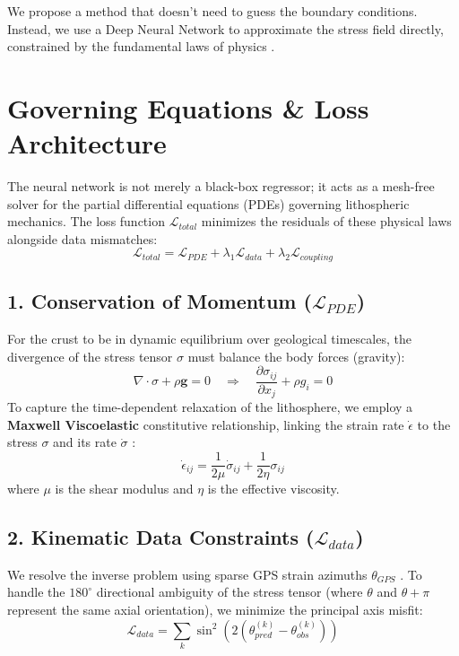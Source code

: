 \documentclass[11pt, a4paper]{article}
\begin{document}
We propose a method that doesn't need to guess the boundary conditions. Instead, we use a Deep Neural Network to approximate the stress field directly, constrained by the fundamental laws of physics \cite{Zhang2022}.

\section{Governing Equations \& Loss Architecture}

The neural network is not merely a black-box regressor; it acts as a mesh-free solver for the partial differential equations (PDEs) governing lithospheric mechanics. The loss function $\mathcal{L}_{total}$ minimizes the residuals of these physical laws alongside data mismatches:
\begin{equation}
    \mathcal{L}_{total} = \mathcal{L}_{PDE} + \lambda_1 \mathcal{L}_{data} + \lambda_2 \mathcal{L}_{coupling}
\end{equation}

\subsection*{1. Conservation of Momentum ($\mathcal{L}_{PDE}$)}
For the crust to be in dynamic equilibrium over geological timescales, the divergence of the stress tensor $\sigma$ must balance the body forces (gravity):
\begin{equation}
    \nabla \cdot \sigma + \rho \mathbf{g} = 0
    \quad \Rightarrow \quad
    \frac{\partial \sigma_{ij}}{\partial x_j} + \rho g_i = 0
\end{equation}
To capture the time-dependent relaxation of the lithosphere, we employ a \textbf{Maxwell Viscoelastic} constitutive relationship, linking the strain rate $\dot{\epsilon}$ to the stress $\sigma$ and its rate $\dot{\sigma}$ \cite{Ranalli1995}:
\begin{equation}
    \dot{\epsilon}_{ij} = \frac{1}{2\mu}\dot{\sigma}_{ij} + \frac{1}{2\eta}\sigma_{ij}
\end{equation}
where $\mu$ is the shear modulus and $\eta$ is the effective viscosity.

\subsection*{2. Kinematic Data Constraints ($\mathcal{L}_{data}$)}
We resolve the inverse problem using sparse GPS strain azimuths $\theta_{GPS}$ \cite{Heidbach2018}. To handle the $180^\circ$ directional ambiguity of the stress tensor (where $\theta$ and $\theta + \pi$ represent the same axial orientation), we minimize the principal axis misfit:
\begin{equation}
    \mathcal{L}_{data} = \sum_{k} \sin^2 \left( 2 \left( \theta_{pred}^{(k)} - \theta_{obs}^{(k)} \right) \right)
\end{equation}
\end{document}
